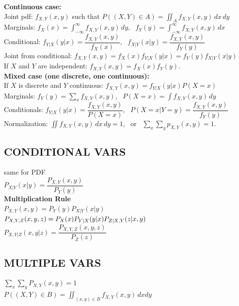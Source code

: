 \textbf{Continuous case:}\\
Joint pdf: $f_{X,Y}(x,y)$ such that $P((X,Y)\in A) = \iint_A f_{X,Y}(x,y)\,dx\,dy$\\
Marginals: $f_X(x) = \int_{-\infty}^{\infty} f_{X,Y}(x,y)\,dy$, \ $f_Y(y) = \int_{-\infty}^{\infty} f_{X,Y}(x,y)\,dx$\\
Conditional: $f_{Y|X}(y|x) = \dfrac{f_{X,Y}(x,y)}{f_X(x)}$, \ $f_{X|Y}(x|y) = \dfrac{f_{X,Y}(x,y)}{f_Y(y)}$\\
Joint from conditional: $f_{X,Y}(x,y) = f_X(x)f_{Y|X}(y|x) = f_Y(y)f_{X|Y}(x|y)$\\
If $X$ and $Y$ are independent: $f_{X,Y}(x,y) = f_X(x)f_Y(y)$.\\

\textbf{Mixed case (one discrete, one continuous):}\\
If $X$ is discrete and $Y$ continuous: $f_{X,Y}(x,y) = f_{Y|X}(y|x)P(X=x)$\\
Marginals: $f_Y(y) = \sum_x f_{X,Y}(x,y)$, \ $P(X=x) = \int f_{X,Y}(x,y)\,dy$\\
Conditionals: $f_{Y|X}(y|x) = \dfrac{f_{X,Y}(x,y)}{P(X=x)}$, \ $P(X=x|Y=y) = \dfrac{f_{X,Y}(x,y)}{f_Y(y)}$\\
Normalization: $\iint f_{X,Y}(x,y)\,dx\,dy = 1$, \ or \ $\sum_x\sum_y p_{X,Y}(x,y) = 1$.\\


\subsection*{CONDITIONAL VARS}
same for PDF\\

$P_{X|Y}(x|y) = \dfrac{P_{X,Y}(x,y)}{P_Y(y)}$\\

\textbf{Multiplication Rule}\\
$P_{X,Y}(x,y) = P_Y(y)P_{X|Y}(x|y)$\\
$P_{X,Y,Z}(x,y,z) = \\
P_X(x)P_{Y|X}(y|x)P_{Z|X,Y}(z|x,y)$\\
$P_{X,Y|Z}(x,y|z) = \dfrac{P_{X,Y,Z}(x,y,z)}{P_Z(z)}$\\

\subsection*{MULTIPLE VARS}

$\sum_x \sum_y P_{X,Y}(x,y) = 1$\\
$P((X,Y) \in B) = \iint_{(x,y)\in B} f_{X,Y}(x,y) \, dxdy$\\

